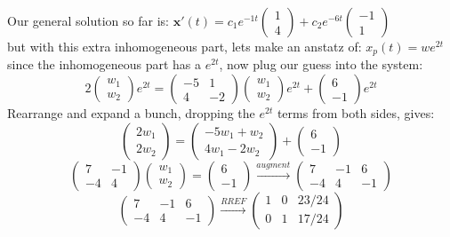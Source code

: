 \documentclass[12pt]{article}
\begin{document}
\noindent
Our general solution so far is: $\mathbf{x}'(t) = c_1 e^{-1t} \begin{pmatrix} 1 \\ 4 \end{pmatrix} + c_2 e^{-6t} \begin{pmatrix} -1 \\ 1 \end{pmatrix}$ \\
but with this extra inhomogeneous part, lets make an anstatz of: $x_p(t) = we^{2t}$ since the inhomogeneous part has a $e^{2t}$, now plug our guess into the system:
\[2\begin{pmatrix} w_1 \\ w_2 \end{pmatrix} e^{2t} = \begin{pmatrix} -5 & 1 \\ 4 & -2 \end{pmatrix} \begin{pmatrix} w_1 \\ w_2 \end{pmatrix} e^{2t} + \begin{pmatrix} 6 \\ -1 \end{pmatrix}e^{2t}\]
Rearrange and expand a bunch, dropping the $e^{2t}$ terms from both sides, gives:
\[\begin{pmatrix} 2w_1 \\ 2w_2 \end{pmatrix} = \begin{pmatrix} -5w_1 + w_2 \\ 4w_1 - 2w_2 \end{pmatrix} + \begin{pmatrix} 6 \\ -1 \end{pmatrix} \]
\[\begin{pmatrix} 7 & -1 \\ -4 & 4 \end{pmatrix} \begin{pmatrix} w_1 \\ w_2 \end{pmatrix} = \begin{pmatrix} 6 \\ -1 \end{pmatrix}
\xrightarrow{augment}
\left(\begin{array}{cc|c}
    7 & -1 & 6 \\
    -4 & 4 & -1
\end{array}\right) \]
\[\left(\begin{array}{cc|c}
    7 & -1 & 6 \\
    -4 & 4 & -1
\end{array}\right)
\xrightarrow{RREF}
\left(\begin{array}{cc|c}
    1 & 0 & 23/24 \\
    0 & 1 & 17/24
\end{array}\right)
\]
\end{document}

